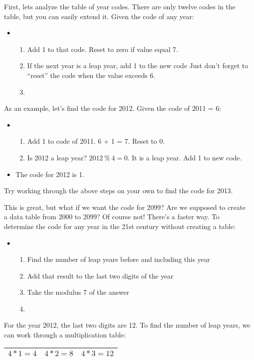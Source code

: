 \documentclass{article}
\begin{document}
  First, lets analyze the table of year codes. 
  There are only twelve codes in the table, but you can easily extend it. 
  Given the code of any year:
  \begin{itemize} \item[] \begin{enumerate}
    \item Add 1 to that code. Reset to zero if value equal 7.
    \item If the next year is a leap year, add 1 to the new code
          Just don't forget to “reset” the code when the value exceeds 6.
    \item[]
  \end{enumerate}\end{itemize}
  As an example, let's find the code for 2012. Given the code of 2011 = 6:
  \begin{itemize} \item[] \begin{enumerate}
    \item Add 1 to code of 2011. 6 + 1 = 7. Reset to 0.
    \item Is 2012 a leap year? $2012 \ \% \ 4 = 0$. It is a leap year. Add 1 to new code.
    \end{enumerate}
    \item[] The code for 2012 is 1.
  \end{itemize}
  Try working through the above steps on your own to find the code for 2013.

\newpage

  This is great, but what if we want the code for 2099? 
  Are we supposed to create a data table from 2000 to 2099? 
  Of course not! There's a faster way. 
  To determine the code for any year in the 21st century without creating a table:
  \begin{itemize} \item[] \begin{enumerate}
    \item Find the number of leap years before and including this year
    \item Add that result to the last two digits of the year
    \item Take the modulus 7 of the answer
    \item[]
  \end{enumerate}\end{itemize}
  For the year 2012, the last two digits are 12. 
  To find the number of leap years, we can work through a multiplication table:
  \begin{center}  
  \begin{tabular}{| c | c | c |}\hline
    $4 * 1 = 4$ & $4 * 2 = 8$ & $4 * 3 = 12$\\\hline
  \end{tabular}
  \end{center}
\end{document}

